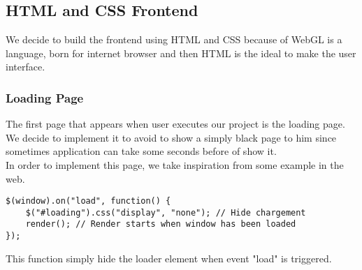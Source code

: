 \documentclass{article}
\begin{document}
\subsection{HTML and CSS Frontend}
We decide to build the frontend using HTML and CSS because of WebGL is a language, born for internet browser and then HTML is the ideal to make the user interface.
\subsubsection{Loading Page}
The first page that appears when user executes our project is the loading page. We decide to implement it to avoid to show a simply black page to him since sometimes application can take some seconds before of show it.\\
In order to implement this page, we take inspiration from some example in the web\cite{loadingpage:web}.
\begin{lstlisting}
$(window).on("load", function() {
	$("#loading").css("display", "none"); // Hide chargement
	render(); // Render starts when window has been loaded
});
\end{lstlisting}
This function simply hide the loader element when event "load" is triggered.
\end{document}
